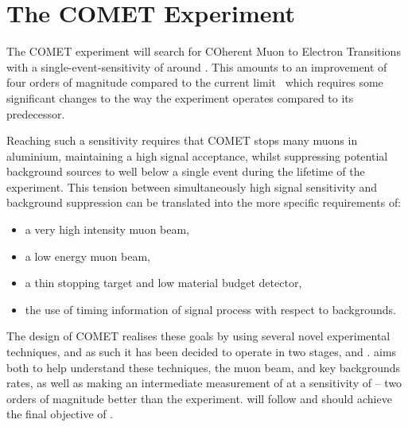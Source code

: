 

\chapter{The COMET Experiment}

The COMET experiment will search for COherent Muon to Electron Transitions with a single-event-sensitivity of around \sensePII.
This amounts to an improvement of four orders of magnitude compared to the current limit~\cite{sindrum2006} which requires some significant changes to the way the experiment operates compared to its predecessor.

Reaching such a sensitivity requires that COMET stops many muons in aluminium, maintaining a high signal acceptance, whilst
suppressing potential background sources to well below a single event during the lifetime of the experiment.
This tension between simultaneously high signal sensitivity and background suppression can be translated into the more specific requirements of:
\begin{itemize}
\setlength{\itemsep}{-1ex}
\item a very high intensity muon beam,
\item a low energy muon beam,
\item a thin stopping target and low material budget detector,
\item the use of timing information of signal process with respect to backgrounds.
\end{itemize}

The design of COMET realises these goals by using several novel experimental techniques, and as such it has been decided to operate in two stages, \phaseI and \phaseII.
\phaseI aims both to help understand these techniques, the muon beam, and key backgrounds rates, as well as making an intermediate measurement of \mueconv at a sensitivity of \sensePI -- two orders of magnitude better than the \sindrumII experiment.
\phaseII will follow and should achieve the final objective of \sensePII. 

